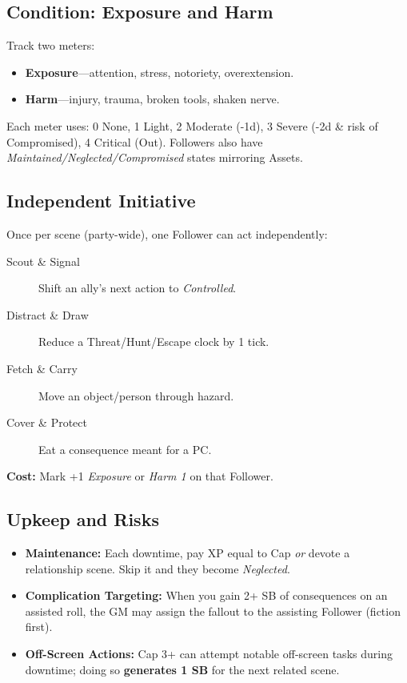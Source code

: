 \subsection*{Condition: Exposure and Harm}
Track two meters:
\begin{itemize}
  \item \textbf{Exposure}—attention, stress, notoriety, overextension.
  \item \textbf{Harm}—injury, trauma, broken tools, shaken nerve.
\end{itemize}
Each meter uses: 0 None, 1 Light, 2 Moderate (-1d), 3 Severe (-2d \& risk of Compromised), 4 Critical (Out). Followers also have \emph{Maintained/Neglected/Compromised} states mirroring Assets.

\subsection*{Independent Initiative}
Once per scene (party-wide), one Follower can act independently:
\begin{description}
  \item[Scout \& Signal] Shift an ally's next action to \emph{Controlled}.
  \item[Distract \& Draw] Reduce a Threat/Hunt/Escape clock by 1 tick.
  \item[Fetch \& Carry] Move an object/person through hazard.
  \item[Cover \& Protect] Eat a consequence meant for a PC.
\end{description}
\textbf{Cost:} Mark +1 \emph{Exposure} or \emph{Harm 1} on that Follower.

\subsection*{Upkeep and Risks}
\begin{itemize}
  \item \textbf{Maintenance:} Each downtime, pay XP equal to Cap \emph{or} devote a relationship scene. Skip it and they become \emph{Neglected}.
  \item \textbf{Complication Targeting:} When you gain 2+ SB of consequences on an assisted roll, the GM may assign the fallout to the assisting Follower (fiction first).
  \item \textbf{Off-Screen Actions:} Cap 3+ can attempt notable off-screen tasks during downtime; doing so \textbf{generates 1 SB} for the next related scene.
\end{itemize}

